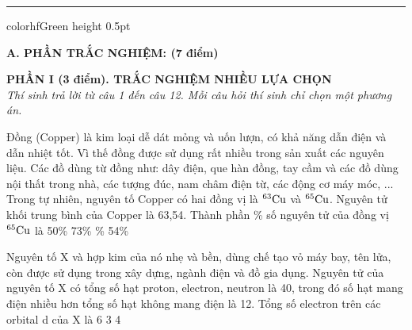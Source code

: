 \documentclass[11pt,a4paper]{article}
\begin{document}
\vspace{4pt}
\hrule color{hfGreen} height 0.5pt

\vspace{4pt}
\noindent
{\color{mainGreen}\textbf{\Large A. PHẦN TRẮC NGHIỆM: (7 điểm)}}

\vspace{3pt}
\noindent
{\color{mainGreen}\textbf{\large PHẦN I (3 điểm). TRẮC NGHIỆM NHIỀU LỰA CHỌN}}\\
\textit{\small Thí sinh trả lời từ câu 1 đến câu 12. Mỗi câu hỏi thí sinh chỉ chọn một phương án.}
\vspace{2pt}

\begin{ex}
Đồng (Copper) là kim loại dễ dát mỏng và uốn lượn, có khả năng dẫn điện và dẫn nhiệt tốt. Vì thế đồng được sử dụng rất nhiều trong sản xuất các nguyên liệu. Các đồ dùng từ đồng như: dây điện, que hàn đồng, tay cầm và các đồ dùng nội thất trong nhà, các tượng đúc, nam châm điện từ, các động cơ máy móc, ... Trong tự nhiên, nguyên tố Copper có hai đồng vị là $^{63}\ce{Cu}$ và $^{65}\ce{Cu}$. Nguyên tử khối trung bình của Copper là 63,54. Thành phần \% số nguyên tử của đồng vị $^{65}\ce{Cu}$ là
\choice
{50\%}
{73\%}
{\%}
{54\%}

\end{ex}
\begin{ex}
Nguyên tố X và hợp kim của nó nhẹ và bền, dùng chế tạo vỏ máy bay, tên lửa, còn được sử dụng trong xây dựng, ngành điện và đồ gia dụng. Nguyên tử của nguyên tố X có tổng số hạt proton, electron, neutron là 40, trong đó số hạt mang điện nhiều hơn tổng số hạt không mang điện là 12. Tổng số electron trên các orbital d của X là
\choice
{}
{6}
{3}
{4}

\end{ex}
\end{document}
